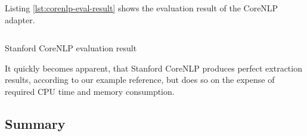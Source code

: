 \newpage
Listing \ref{lst:corenlp-eval-result} shows the evaluation result of the CoreNLP adapter.

\begin{listing}[H]
\inputminted{java}{corenlp.txt}
\caption{Stanford CoreNLP evaluation result}
\label{lst:corenlp-eval-result}
\end{listing}

It quickly becomes apparent, that Stanford CoreNLP produces perfect extraction results, according to our example reference, but does so on the expense of required CPU time and memory consumption.

\newpage
\subsection{Summary}
